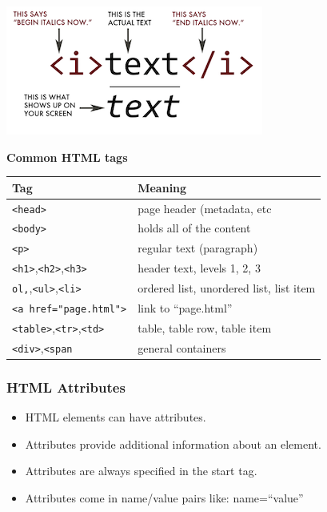 \documentclass[]{book}
\providecommand{\tightlist}{%
  \setlength{\itemsep}{0pt}\setlength{\parskip}{0pt}}
\begin{document}
\begin{center}\includegraphics[width=0.7\linewidth]{img/html-tags} \end{center}

\textbf{Common HTML tags}

\begin{longtable}[]{@{}ll@{}}
\toprule
Tag & Meaning\tabularnewline
\midrule
\endhead
\texttt{\textless{}head\textgreater{}} & page header (metadata, etc\tabularnewline
\texttt{\textless{}body\textgreater{}} & holds all of the content\tabularnewline
\texttt{\textless{}p\textgreater{}} & regular text (paragraph)\tabularnewline
\texttt{\textless{}h1\textgreater{}},\texttt{\textless{}h2\textgreater{}},\texttt{\textless{}h3\textgreater{}} & header text, levels 1, 2, 3\tabularnewline
\texttt{ol,},\texttt{\textless{}ul\textgreater{}},\texttt{\textless{}li\textgreater{}} & ordered list, unordered list, list item\tabularnewline
\texttt{\textless{}a\ href="page.html"\textgreater{}} & link to ``page.html''\tabularnewline
\texttt{\textless{}table\textgreater{}},\texttt{\textless{}tr\textgreater{}},\texttt{\textless{}td\textgreater{}} & table, table row, table item\tabularnewline
\texttt{\textless{}div\textgreater{}},\texttt{\textless{}span} & general containers\tabularnewline
\bottomrule
\end{longtable}

\hypertarget{html-attributes}{%
\subsubsection*{HTML Attributes}\label{html-attributes}}

\begin{itemize}
\tightlist
\item
  HTML elements can have attributes.
\item
  Attributes provide additional information about an element.
\item
  Attributes are always specified in the start tag.
\item
  Attributes come in name/value pairs like: name=``value''
\end{itemize}
\end{document}
